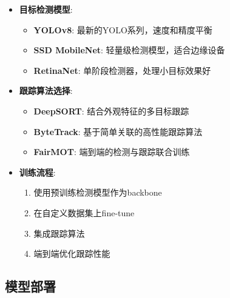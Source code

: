 \begin{itemize}
\tightlist
\item
  \textbf{目标检测模型}:

  \begin{itemize}
  \tightlist
  \item
    \textbf{YOLOv8}: 最新的YOLO系列，速度和精度平衡
  \item
    \textbf{SSD MobileNet}: 轻量级检测模型，适合边缘设备
  \item
    \textbf{RetinaNet}: 单阶段检测器，处理小目标效果好
  \end{itemize}
\item
  \textbf{跟踪算法选择}:

  \begin{itemize}
  \tightlist
  \item
    \textbf{DeepSORT}: 结合外观特征的多目标跟踪
  \item
    \textbf{ByteTrack}: 基于简单关联的高性能跟踪算法
  \item
    \textbf{FairMOT}: 端到端的检测与跟踪联合训练
  \end{itemize}
\item
  \textbf{训练流程}:

  \begin{enumerate}
  \def\labelenumi{\arabic{enumi}.}
  \tightlist
  \item
    使用预训练检测模型作为backbone
  \item
    在自定义数据集上fine-tune
  \item
    集成跟踪算法
  \item
    端到端优化跟踪性能
  \end{enumerate}
\end{itemize}

\subsection{模型部署}\label{ux6a21ux578bux90e8ux7f72}


